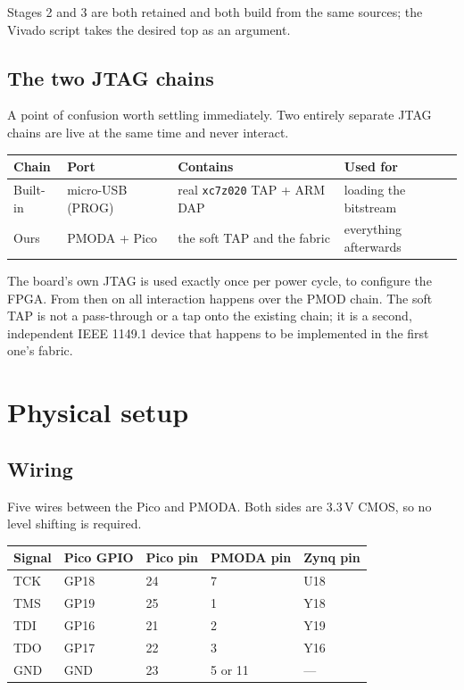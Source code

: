 \documentclass[11pt,a4paper]{article}
\begin{document}
Stages 2 and 3 are both retained and both build from the same sources; the
Vivado script takes the desired top as an argument.

\subsection{The two JTAG chains}

A point of confusion worth settling immediately. Two entirely separate JTAG
chains are live at the same time and never interact.

\begin{center}
\begin{tabular}{llll}
\toprule
\textbf{Chain} & \textbf{Port} & \textbf{Contains} & \textbf{Used for} \\
\midrule
Built-in & micro-USB (PROG) & real \texttt{xc7z020} TAP + ARM DAP & loading the bitstream \\
Ours     & PMODA + Pico     & the soft TAP and the fabric          & everything afterwards \\
\bottomrule
\end{tabular}
\end{center}

The board's own JTAG is used exactly once per power cycle, to configure the
FPGA. From then on all interaction happens over the PMOD chain. The soft TAP is
not a pass-through or a tap onto the existing chain; it is a second, independent
IEEE 1149.1 device that happens to be implemented in the first one's fabric.

\section{Physical setup}

\subsection{Wiring}

Five wires between the Pico and PMODA. Both sides are 3.3\,V CMOS, so no level
shifting is required.

\begin{center}
\begin{tabular}{lllll}
\toprule
\textbf{Signal} & \textbf{Pico GPIO} & \textbf{Pico pin} & \textbf{PMODA pin} & \textbf{Zynq pin} \\
\midrule
TCK & GP18 & 24 & 7       & U18 \\
TMS & GP19 & 25 & 1       & Y18 \\
TDI & GP16 & 21 & 2       & Y19 \\
TDO & GP17 & 22 & 3       & Y16 \\
GND & GND  & 23 & 5 or 11 & --- \\
\bottomrule
\end{tabular}
\end{center}
\end{document}
